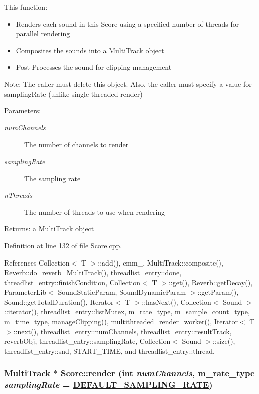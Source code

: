 This function:\begin{itemize}
\item Renders each sound in this Score using a specified number of threads for parallel rendering\item Composites the sounds into a \hyperlink{classMultiTrack}{Multi\-Track} object\item Post-Processes the sound for clipping management\end{itemize}


\begin{Desc}
\item[Note:]The caller must delete this object. Also, the caller must specify a value for sampling\-Rate (unlike single-threaded render) \end{Desc}
\begin{Desc}
\item[Parameters:]
\begin{description}
\item[{\em num\-Channels}]The number of channels to render \item[{\em sampling\-Rate}]The sampling rate \item[{\em n\-Threads}]The number of threads to use when rendering \end{description}
\end{Desc}
\begin{Desc}
\item[Returns:]a \hyperlink{classMultiTrack}{Multi\-Track} object \end{Desc}


Definition at line 132 of file Score.cpp.

References Collection$<$ T $>$::add(), cmm\_\-, Multi\-Track::composite(), Reverb::do\_\-reverb\_\-Multi\-Track(), threadlist\_\-entry::done, threadlist\_\-entry::finish\-Condition, Collection$<$ T $>$::get(), Reverb::get\-Decay(), Parameter\-Lib$<$ Sound\-Static\-Param, Sound\-Dynamic\-Param $>$::get\-Param(), Sound::get\-Total\-Duration(), Iterator$<$ T $>$::has\-Next(), Collection$<$ Sound $>$::iterator(), threadlist\_\-entry::list\-Mutex, m\_\-rate\_\-type, m\_\-sample\_\-count\_\-type, m\_\-time\_\-type, manage\-Clipping(), multithreaded\_\-render\_\-worker(), Iterator$<$ T $>$::next(), threadlist\_\-entry::num\-Channels, threadlist\_\-entry::result\-Track, reverb\-Obj, threadlist\_\-entry::sampling\-Rate, Collection$<$ Sound $>$::size(), threadlist\_\-entry::snd, START\_\-TIME, and threadlist\_\-entry::thread.\hypertarget{classScore_a1}{
\subsubsection[render]{\setlength{\rightskip}{0pt plus 5cm}\hyperlink{classMultiTrack}{Multi\-Track} $\ast$ Score::render (int {\em num\-Channels}, \hyperlink{Types_8h_a4}{m\_\-rate\_\-type} {\em sampling\-Rate} = \hyperlink{Types_8h_a5}{DEFAULT\_\-SAMPLING\_\-RATE})}}
\label{classScore_a1}


